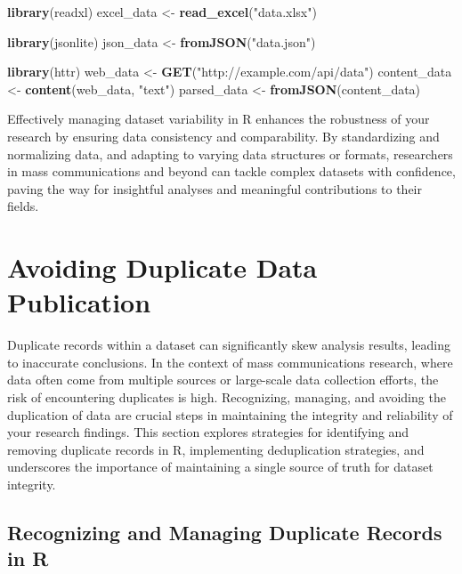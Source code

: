 \documentclass[
]{book}
\newenvironment{Shaded}{\begin{snugshade}}{\end{snugshade}}
\newcommand{\FunctionTok}[1]{\textcolor[rgb]{0.13,0.29,0.53}{\textbf{#1}}}
\newcommand{\NormalTok}[1]{#1}
\newcommand{\OtherTok}[1]{\textcolor[rgb]{0.56,0.35,0.01}{#1}}
\newcommand{\StringTok}[1]{\textcolor[rgb]{0.31,0.60,0.02}{#1}}
\begin{document}
\begin{Shaded}
\begin{Highlighting}[]
\FunctionTok{library}\NormalTok{(readxl)}
\NormalTok{excel\_data }\OtherTok{\textless{}{-}} \FunctionTok{read\_excel}\NormalTok{(}\StringTok{"data.xlsx"}\NormalTok{)}

\FunctionTok{library}\NormalTok{(jsonlite)}
\NormalTok{json\_data }\OtherTok{\textless{}{-}} \FunctionTok{fromJSON}\NormalTok{(}\StringTok{"data.json"}\NormalTok{)}

\FunctionTok{library}\NormalTok{(httr)}
\NormalTok{web\_data }\OtherTok{\textless{}{-}} \FunctionTok{GET}\NormalTok{(}\StringTok{"http://example.com/api/data"}\NormalTok{)}
\NormalTok{content\_data }\OtherTok{\textless{}{-}} \FunctionTok{content}\NormalTok{(web\_data, }\StringTok{"text"}\NormalTok{)}
\NormalTok{parsed\_data }\OtherTok{\textless{}{-}} \FunctionTok{fromJSON}\NormalTok{(content\_data)}
\end{Highlighting}
\end{Shaded}

Effectively managing dataset variability in R enhances the robustness of your research by ensuring data consistency and comparability. By standardizing and normalizing data, and adapting to varying data structures or formats, researchers in mass communications and beyond can tackle complex datasets with confidence, paving the way for insightful analyses and meaningful contributions to their fields.

\hypertarget{avoiding-duplicate-data-publication}{%
\section{Avoiding Duplicate Data Publication}\label{avoiding-duplicate-data-publication}}

Duplicate records within a dataset can significantly skew analysis results, leading to inaccurate conclusions. In the context of mass communications research, where data often come from multiple sources or large-scale data collection efforts, the risk of encountering duplicates is high. Recognizing, managing, and avoiding the duplication of data are crucial steps in maintaining the integrity and reliability of your research findings. This section explores strategies for identifying and removing duplicate records in R, implementing deduplication strategies, and underscores the importance of maintaining a single source of truth for dataset integrity.

\hypertarget{recognizing-and-managing-duplicate-records-in-r}{%
\subsection*{Recognizing and Managing Duplicate Records in R}\label{recognizing-and-managing-duplicate-records-in-r}}
\end{document}
